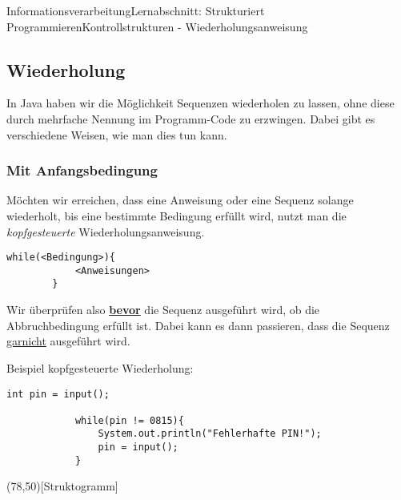 \documentclass[11pt,oneside,openany,headings=optiontotoc,11pt,numbers=noenddot]{article}
\begin{document}
	\begin{worksheet}{Informationsverarbeitung}{Lernabschnitt: Strukturiert Programmieren}{Kontrollstrukturen - Wiederholungsanweisung}
		\setlength{\columnseprule}{0pt}
		\noindent
		\setcounter{section}{6}
		\setcounter{page}{24}
		\setcounter{subsection}{3}
		\vspace*{-35pt}
		\subsection{Wiederholung}
		In Java haben wir die Möglichkeit Sequenzen wiederholen zu lassen, ohne diese durch mehrfache Nennung im Programm-Code zu erzwingen. Dabei gibt es verschiedene Weisen, wie man dies tun kann.
		\subsubsection{Mit Anfangsbedingung}
		\label{anfb}
		Möchten wir erreichen, dass eine Anweisung oder eine Sequenz solange wiederholt, bis eine bestimmte Bedingung erfüllt wird, nutzt man die \textit{kopfgesteuerte} Wiederholungsanweisung.
		\begin{lstlisting}[style=JavaInputStyle]
		while(<Bedingung>){
			<Anweisungen>
		}
		\end{lstlisting}
		\par\noindent
		Wir überprüfen also \underline{\textbf{bevor}} die Sequenz ausgeführt wird, ob die Abbruchbedingung erfüllt ist. Dabei kann es dann passieren, dass die Sequenz \underline{garnicht} ausgeführt wird.
		\par\noindent
		\begin{minipage}[t]{0.48\textwidth}
			\vspace*{0pt}
			Beispiel kopfgesteuerte Wiederholung:
			\begin{lstlisting}[style=JavaInputStyle,frame=single]
			int pin = input();
			
			while(pin != 0815){
				System.out.println("Fehlerhafte PIN!");
				pin = input();
			}
			\end{lstlisting}
		\end{minipage}
		\hfill
		\begin{minipage}[t]{0.48\textwidth}
			\vspace*{0pt}
			\begin{struktogramm}(78,50)[Struktogramm]
				\whileend
			\end{struktogramm}
		\end{minipage}
		\vspace*{-50pt}

\end{worksheet}
\end{document}
